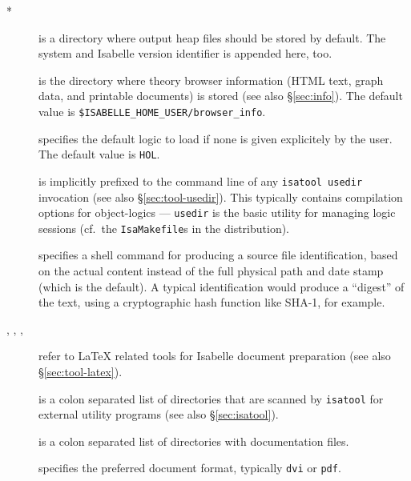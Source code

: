 \begin{description}
\item[*] is a directory where output heap files should
  be stored by default. The {\ML} system and Isabelle version identifier is
  appended here, too.
  
\item[] is the directory where theory browser
  information (HTML text, graph data, and printable documents) is stored (see
  also \S\ref{sec:info}).  The default value is
  \texttt{\$ISABELLE_HOME_USER/browser_info}.
  
\item[] specifies the default logic to load if none is
  given explicitely by the user.  The default value is \texttt{HOL}.
  
\item[] is implicitly prefixed to the command
  line of any \texttt{isatool usedir} invocation (see also
  \S\ref{sec:tool-usedir}). This typically contains compilation options for
  object-logics --- \texttt{usedir} is the basic utility for managing logic
  sessions (cf.\ the \texttt{IsaMakefile}s in the distribution).

\item[] specifies a shell command for
  producing a source file identification, based on the actual content
  instead of the full physical path and date stamp (which is the
  default). A typical identification would produce a ``digest'' of the
  text, using a cryptographic hash function like SHA-1, for example.
  
\item[, ,
  , ] refer to {\LaTeX} related
  tools for Isabelle document preparation (see also \S\ref{sec:tool-latex}).
  
\item[] is a colon separated list of directories that
  are scanned by \texttt{isatool} for external utility programs (see also
  \S\ref{sec:isatool}).
  
\item[] is a colon separated list of directories with
  documentation files.
  
\item[] specifies the preferred document format,
  typically \texttt{dvi} or \texttt{pdf}.
  

\end{description}
